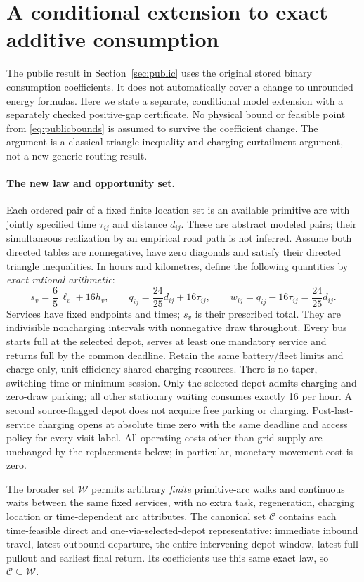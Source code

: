 \section{A conditional extension to exact additive consumption}
\label{sec:exactenergyextension}
The public result in Section~\ref{sec:public} uses the original stored
binary consumption coefficients. It does not automatically cover a change
to unrounded energy formulas. Here we state a separate, conditional model
extension with a separately checked positive-gap certificate. No physical
bound or feasible point from \eqref{eq:publicbounds} is assumed to survive
the coefficient change. The argument is a classical triangle-inequality and
charging-curtailment argument, not a new generic routing result.

\paragraph{The new law and opportunity set.}
Each ordered pair of a fixed finite location set is an available primitive
arc with jointly specified time $\tau_{ij}$ and distance $d_{ij}$.
These are abstract modeled pairs; their simultaneous realization by an
empirical road path is not inferred. Assume both directed tables are
nonnegative, have zero diagonals and satisfy their directed triangle
inequalities. In hours and kilometres, define the following quantities
by \emph{exact rational arithmetic}:
\[
 s_v=\frac65\,\ell_v+16h_v,\qquad
 q_{ij}=\frac{24}{25}d_{ij}+16\tau_{ij},\qquad
 w_{ij}=q_{ij}-16\tau_{ij}=\frac{24}{25}d_{ij}.
\]
Services have fixed endpoints and times; $s_v$ is their prescribed total.
They are indivisible noncharging intervals with nonnegative draw throughout.
Every bus starts full at the selected depot,
serves at least one mandatory service and returns full by the common
deadline. Retain the same battery/fleet limits and charge-only,
unit-efficiency shared charging resources. There is no taper, switching
time or minimum session. Only the selected depot admits charging and
zero-draw parking; all other stationary waiting consumes exactly 16 per
hour. A second source-flagged depot does not acquire free parking or
charging. Post-last-service charging opens at absolute time zero with the
same deadline and access policy for every visit label. All operating
costs other than grid supply are unchanged by the replacements below;
in particular, monetary movement cost is zero.

The broader set $\mathcal W$ permits arbitrary \emph{finite} primitive-arc
walks and continuous waits between the same fixed services, with no extra
task, regeneration, charging location or time-dependent arc attributes.
The canonical set $\mathcal C$ contains each time-feasible direct and
one-via-selected-depot representative: immediate inbound travel, latest
outbound departure, the entire intervening depot window, latest full
pullout and earliest final return. Its coefficients use this same exact
law, so $\mathcal C\subseteq\mathcal W$.

